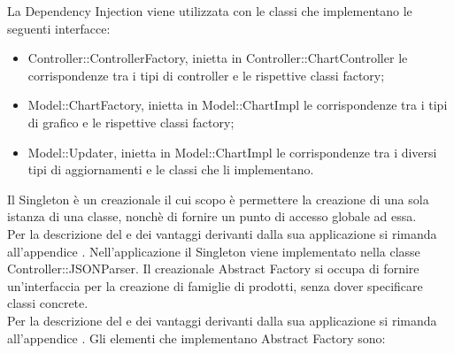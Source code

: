                 La Dependency Injection viene utilizzata con le classi che implementano le seguenti interfacce:
                \begin{itemize}
                    \item Controller::ControllerFactory, inietta in Controller::ChartController le corrispondenze tra i tipi di controller e le rispettive classi factory;
                    \item Model::ChartFactory, inietta in Model::ChartImpl le  corrispondenze tra i tipi di grafico e le rispettive classi factory;
                    \item Model::Updater, inietta in Model::ChartImpl le corrispondenze tra i diversi tipi di aggiornamenti e le classi che li implementano.
                \end{itemize}
            Il Singleton è un  creazionale il cui scopo è permettere la creazione di una sola istanza di una classe, nonchè di fornire un punto di accesso globale ad essa.\\
            Per la descrizione del  e dei vantaggi derivanti dalla sua applicazione si rimanda all'appendice .
                Nell'applicazione  il Singleton viene implementato nella classe Controller::JSONParser.
            Il  creazionale Abstract Factory si occupa di fornire un'interfaccia per la creazione di famiglie di prodotti, senza dover specificare classi concrete. \\
            Per la descrizione del  e dei vantaggi derivanti dalla sua applicazione si rimanda all'appendice .
                Gli elementi che implementano Abstract Factory sono:

